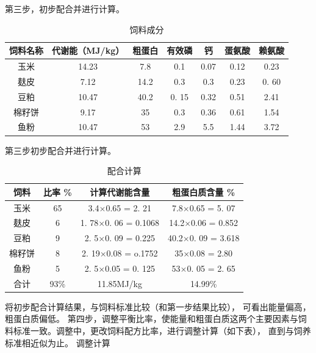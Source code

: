 \documentclass{ctexbook}
\begin{document}
第三步，初步配合并进行计算。
\begin{table}[htbp]
	\centering
	\caption{饲料成分}
	\begin{tabular}{c|c|c|c|c|c|c}
		\hline
		饲料名称  & 代谢能（MJ/kg） & 粗蛋白 & 有效磷 & 钙 & 蛋氨酸 & 赖氨酸  \\ \hline
		玉米    & 14.23  & 7.8   & 0.1   & 0.07  & 0.12  & 0.23 \\ \hline
		麸皮    & 7.12  & 14.2  & 0.3   & 0.3   & 0.23  & 0. 60 \\ \hline
		豆粕    & 10.47  & 40.2  & 0. 15 & 0.32  & 0.51  & 2.41 \\ \hline
		棉籽饼   & 9.17  & 35    & 0.3   & 0.36  & 0.61  & 1.54 \\ \hline
		鱼粉    & 10.47  & 53    & 2.9   & 5.5   & 1.44  & 3.72 \\ \hline
	\end{tabular}%
	\label{tab:nengliang}%
\end{table}%
第三步初步配合并进行计算。
\begin{table}[htbp]
	\centering
	\caption{配合计算}
	\begin{tabular}{c|c|c|c}
		\hline
		饲料    & 比率 \% & 计算代谢能含量 & 粗蛋白质含量 \% \\ \hline
		玉米    & 65    & 3.4$\times$0.65 = 2. 21 & 7.8$\times$0.65 = 5. 07 \\ \hline
		麸皮    & 6     & 1. 78$\times$0. 06 = 0.1068 & 14.2$\times$0.06 = 0.852 \\ \hline
		豆粕    & 9     & 2. 5$\times$0. 09 = 0.225 & 40.2$\times$0. 09 = 3.618 \\ \hline
		棉籽饼   & 8     & 2. 19$\times$0.08 = o.1752 & 35$\times$0.08 = 2.80 \\  \hline
		鱼粉    & 5     & 2. 5$\times$0.05 = 0. 125  & 53$\times$0. 05 = 2. 65 \\ \hline
		合计    & 93\%  & 11.85MJ/kg & 14.99\% \\ \hline
	\end{tabular}%
	\label{tab:peihe}%
\end{table}%
将初步配合计算结果，与饲料标准比较（和第一步结果比较）， 可看出能量偏高，粗蛋白质偏低。
第四步，调整平衡比率，使能量和粗蛋白质这两个主要因素与饲 料标准一致。调整中，更改饲料配方比率，进行调整计算（如下表）， 直到与饲养标准相近似为止。
调整计算
\end{document}
